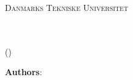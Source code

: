 \begin{titlepage}
	\textsc{\LARGE Danmarks Tekniske Universitet}\\[0.5cm] %
	
	
	
	
	\HRule\\[0.5cm]
	
    {\LARGE\bfseries \Title \par} %
    \vspace{0.4cm} %
    
	\HRule\\[0.5cm]
	
	\textsc{\Large (\KursusId) \KursusNavn}\\[1.5cm] %

    \begin{minipage}{1\textwidth}
		\begin{flushleft}
            \centering
            
            \textbf{Authors}: \\ \Navn \\ 
            
		\end{flushleft}
	\end{minipage} 
    \\[1cm]
    \vfill \vfill


    \begin{minipage}{0.68\textwidth}
                \textit{\Abstract} 
	\end{minipage} 
    \\[1cm]
    \vfill \vfill


\end{titlepage}
